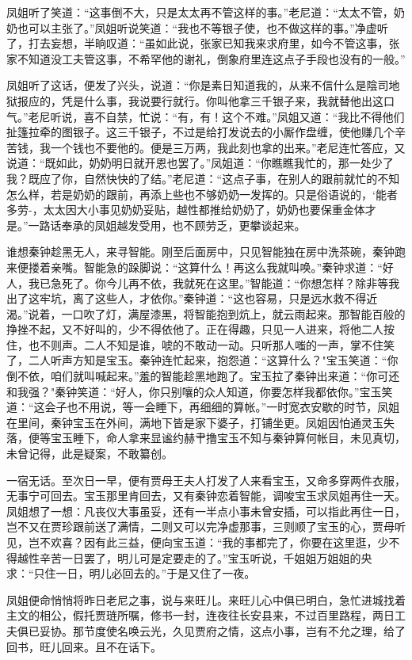 凤姐听了笑道：“这事倒不大，只是太太再不管这样的事。”老尼道：“太太不管，奶奶也可以主张了。”凤姐听说笑道：“我也不等银子使，也不做这样的事。”净虚听了，打去妄想，半晌叹道：“虽如此说，张家已知我来求府里，如今不管这事，张家不知道没工夫管这事，不希罕他的谢礼，倒象府里连这点子手段也没有的一般。”

凤姐听了这话，便发了兴头，说道：“你是素日知道我的，从来不信什么是陰司地狱报应的，凭是什么事，我说要行就行。你叫他拿三千银子来，我就替他出这口气。”老尼听说，喜不自禁，忙说：“有，有！这个不难。”凤姐又道：“我比不得他们扯篷拉牵的图银子。这三千银子，不过是给打发说去的小厮作盘缠，使他赚几个辛苦钱，我一个钱也不要他的。便是三万两，我此刻也拿的出来。”老尼连忙答应，又说道：“既如此，奶奶明日就开恩也罢了。”凤姐道：“你瞧瞧我忙的，那一处少了我？既应了你，自然快快的了结。”老尼道：“这点子事，在别人的跟前就忙的不知怎么样，若是奶奶的跟前，再添上些也不够奶奶一发挥的。只是俗语说的，`能者多劳-，太太因大小事见奶奶妥贴，越性都推给奶奶了，奶奶也要保重金体才是。”一路话奉承的凤姐越发受用，也不顾劳乏，更攀谈起来。

谁想秦钟趁黑无人，来寻智能。刚至后面房中，只见智能独在房中洗茶碗，秦钟跑来便搂着亲嘴。智能急的跺脚说：“这算什么！再这么我就叫唤。”秦钟求道：“好人，我已急死了。你今儿再不依，我就死在这里。”智能道：“你想怎样？除非等我出了这牢坑，离了这些人，才依你。”秦钟道：“这也容易，只是远水救不得近渴。”说着，一口吹了灯，满屋漆黑，将智能抱到炕上，就云雨起来。那智能百般的挣挫不起，又不好叫的，少不得依他了。正在得趣，只见一人进来，将他二人按住，也不则声。二人不知是谁，唬的不敢动一动。只听那人嗤的一声，掌不住笑了，二人听声方知是宝玉。秦钟连忙起来，抱怨道：“这算什么？"宝玉笑道：“你倒不依，咱们就叫喊起来。”羞的智能趁黑地跑了。宝玉拉了秦钟出来道：“你可还和我强？"秦钟笑道：“好人，你只别嚷的众人知道，你要怎样我都依你。”宝玉笑道：“这会子也不用说，等一会睡下，再细细的算帐。”一时宽衣安歇的时节，凤姐在里间，秦钟宝玉在外间，满地下皆是家下婆子，打铺坐更。凤姐因怕通灵玉失落，便等宝玉睡下，命人拿来显谧约赫肀撸宝玉不知与秦钟算何帐目，未见真切，未曾记得，此是疑案，不敢纂创。

一宿无话。至次日一早，便有贾母王夫人打发了人来看宝玉，又命多穿两件衣服，无事宁可回去。宝玉那里肯回去，又有秦钟恋着智能，调唆宝玉求凤姐再住一天。凤姐想了一想：凡丧仪大事虽妥，还有一半点小事未曾安插，可以指此再住一日，岂不又在贾珍跟前送了满情，二则又可以完净虚那事，三则顺了宝玉的心，贾母听见，岂不欢喜？因有此三益，便向宝玉道：“我的事都完了，你要在这里逛，少不得越性辛苦一日罢了，明儿可是定要走的了。”宝玉听说，千姐姐万姐姐的央求：“只住一日，明儿必回去的。”于是又住了一夜。

凤姐便命悄悄将昨日老尼之事，说与来旺儿。来旺儿心中俱已明白，急忙进城找着主文的相公，假托贾琏所嘱，修书一封，连夜往长安县来，不过百里路程，两日工夫俱已妥协。那节度使名唤云光，久见贾府之情，这点小事，岂有不允之理，给了回书，旺儿回来。且不在话下。

